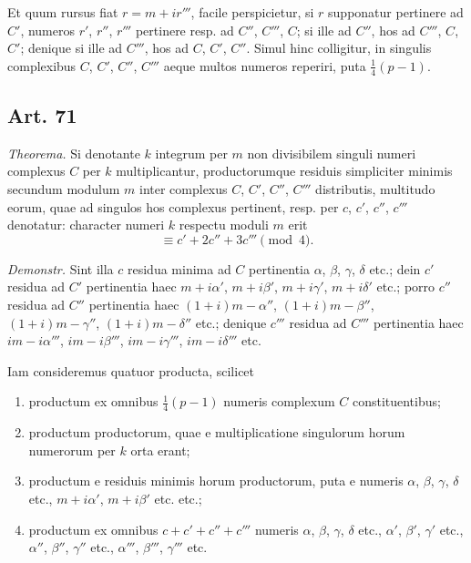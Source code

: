 \documentclass[12pt]{article}
\newcommand{\art}[1]{\subsection*{Art. #1}}
\begin{document}
Et quum rursus fiat $r=m+ir'''$, facile perspicietur, si $r$ supponatur pertinere ad $C'$, numeros $r'$, $r''$, $r'''$ pertinere resp. ad $C''$, $C'''$, $C$; si ille ad $C''$, hos ad $C'''$, $C$, $C'$; denique si ille ad $C'''$, hos ad $C$, $C'$, $C''$. Simul hinc colligitur, in singulis complexibus $C$, $C'$, $C''$, $C'''$ aeque multos numeros reperiri, puta $\frac14(p-1)$.

\art{71}
\textit{Theorema.} Si denotante $k$ integrum per $m$ non divisibilem singuli numeri complexus $C$ per $k$ multiplicantur, productorumque residuis simpliciter minimis secundum modulum $m$ inter complexus $C$, $C'$, $C''$, $C'''$ distributis, multitudo eorum, quae ad singulos hos complexus pertinent, resp. per $c$, $c'$, $c''$, $c'''$ denotatur: character numeri $k$ respectu moduli $m$ erit
\[
\equiv c'+2c''+3c'''\pmod4.
\]

\textit{Demonstr.} Sint illa $c$ residua minima ad $C$ pertinentia $\alpha$, $\beta$, $\gamma$, $\delta$ etc.; dein $c'$ residua ad $C'$ pertinentia haec $m+i\alpha'$, $m+i\beta'$, $m+i\gamma'$, $m+i\delta'$ etc.; porro $c''$ residua ad $C''$ pertinentia haec $(1+i)m-\alpha''$, $(1+i)m-\beta''$, $(1+i)m-\gamma''$, $(1+i)m-\delta''$ etc.; denique $c'''$ residua ad $C'''$ pertinentia haec $im-i\alpha'''$, $im-i\beta'''$, $im-i\gamma'''$, $im-i\delta'''$ etc.

Iam consideremus quatuor producta, scilicet

\begin{enumerate}[label=\arabic*.]
\item productum ex omnibus $\frac14(p-1)$ numeris complexum $C$ constituentibus;
\item productum productorum, quae e multiplicatione singulorum horum numerorum per $k$ orta erant;
\item productum e residuis minimis horum productorum, puta e numeris $\alpha$, $\beta$, $\gamma$, $\delta$ etc., $m+i\alpha'$, $m+i\beta'$ etc. etc.;
\item productum ex omnibus $c+c'+c''+c'''$ numeris $\alpha$, $\beta$, $\gamma$, $\delta$ etc., $\alpha'$, $\beta'$, $\gamma'$ etc., $\alpha''$, $\beta''$, $\gamma''$ etc., $\alpha'''$, $\beta'''$, $\gamma'''$ etc.
\end{enumerate}
\end{document}
